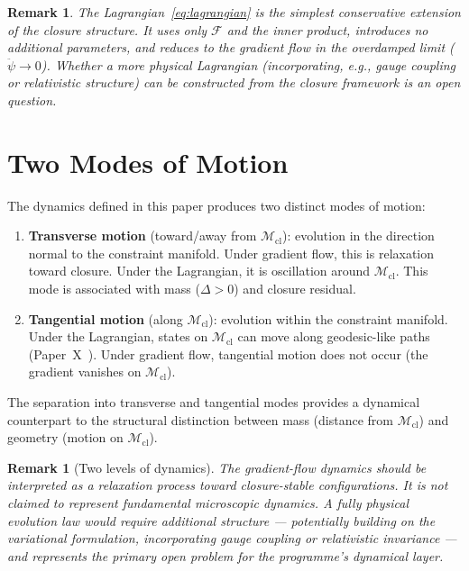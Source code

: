 \documentclass[12pt]{article}
\newtheorem{remark}[theorem]{Remark}
\newcommand{\Mcl}{\mathcal{M}_{\mathrm{cl}}}
\newcommand{\Fcal}{\mathcal{F}}
\begin{document}
\begin{remark}
The Lagrangian~\eqref{eq:lagrangian} is the simplest conservative extension of the closure structure. It uses only $\Fcal$ and the inner product, introduces no additional parameters, and reduces to the gradient flow in the overdamped limit ($\ddot{\psi} \to 0$). Whether a more physical Lagrangian (incorporating, e.g., gauge coupling or relativistic structure) can be constructed from the closure framework is an open question.
\end{remark}

\section{Two Modes of Motion}\label{sec:modes}

The dynamics defined in this paper produces two distinct modes of motion:

\begin{enumerate}
    \item \textbf{Transverse motion} (toward/away from $\Mcl$): evolution in the direction normal to the constraint manifold. Under gradient flow, this is relaxation toward closure. Under the Lagrangian, it is oscillation around $\Mcl$. This mode is associated with mass ($\Delta > 0$) and closure residual.

    \item \textbf{Tangential motion} (along $\Mcl$): evolution within the constraint manifold. Under the Lagrangian, states on $\Mcl$ can move along geodesic-like paths (Paper~X~\citep{SmartX}). Under gradient flow, tangential motion does not occur (the gradient vanishes on $\Mcl$).
\end{enumerate}

The separation into transverse and tangential modes provides a dynamical counterpart to the structural distinction between mass (distance from $\Mcl$) and geometry (motion on $\Mcl$).

\begin{remark}[Two levels of dynamics]
The gradient-flow dynamics should be interpreted as a relaxation process toward closure-stable configurations. It is not claimed to represent fundamental microscopic dynamics. A fully physical evolution law would require additional structure --- potentially building on the variational formulation, incorporating gauge coupling or relativistic invariance --- and represents the primary open problem for the programme's dynamical layer.
\end{remark}
\end{document}
